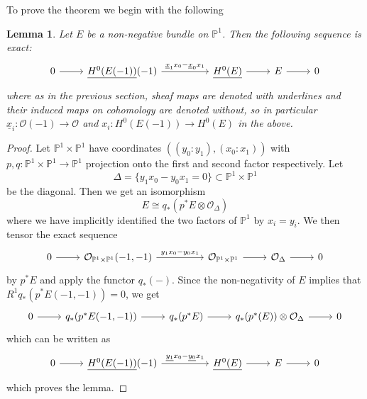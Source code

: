 \documentclass{amsart}
\newtheorem{lemma}[theorem]{Lemma}
\theoremstyle{definition}
\newcommand{\PP}{\mathbb{P}}
\newcommand{\OO}{\mathcal{O}}
\newcommand{\UL}[1]{\underline{#1}}
\begin{document}
To prove the theorem we begin with the following
\begin{lemma}\label{lem: Stromme}
Let $E$ be a non-negative bundle on $\PP^{1}$. Then the following
sequence is exact:
\[
\begin{tikzcd}
0\arrow{r} & \UL{H^{0}(E(-1))}(-1)
\arrow{rr}{\UL{x}_{1}x_{0}-\UL{x}_{0}x_{1}}& &
\UL{H^{0}(E)} \arrow{r} & E\arrow[r] & 0
\end{tikzcd}
\]
where as in the previous section, sheaf maps are denoted with
underlines and their induced maps on cohomology are denoted without,
so in particular $\UL{x}_{i}:\OO (-1)\to \OO$ and
$x_{i}:H^{0}(E(-1))\to H^{0}(E)$ in the above.
\end{lemma}
\begin{proof}
Let $\PP^{1}\times \PP^{1}$ have coordinates
$((y_{0}:y_{1}),(x_{0}:x_{1}))$ with $p,q:\PP^{1}\times \PP^{1}\to
\PP^{1}$ projection onto the first and second factor respectively. Let 
\[
\Delta =\{y_{1}x_{0}-y_{0}x_{1} =0 \}\subset \PP^{1}\times \PP^{1}
\]
be the diagonal. Then we get an isomorphism
\[
E\cong q_{*}\left(p^{*}E\otimes \OO_{\Delta} \right)
\]
where we have implicitly identified the two factors of $\PP^{1}$ by
$x_{i}=y_{i}$.  We then tensor the exact sequence
\[
\begin{tikzcd}
0\arrow[r] & \OO_{\PP^{1}\times \PP^{1}}(-1,-1)
\arrow{rr}{y_{1}x_{0}-y_{0}x_{1}}& & \OO_{\PP^{1}\times \PP^{1}}
\arrow[r]& \OO_{\Delta} \arrow[r]& 0
\end{tikzcd}
\]
by $p^{*}E$ and apply the functor $q_{*}(-)$. Since the non-negativity
of $E$ implies that $R^{1}q_{*}(p^{*}E(-1,-1))=0$, we get
\[
\begin{tikzcd}
0\arrow[r] &q_{*}(p^{*}E(-1,-1)) \arrow[r] & q_{*}(p^{*}E) \arrow[r] &
q_{*}(p^{*}(E))\otimes \OO_{\Delta} \arrow[r] & 0 
\end{tikzcd}
\]
which can be written as 
\[
\begin{tikzcd}
0\arrow[r] &\UL{H^{0}(E(-1))}(-1)
\arrow{rr}{\UL{y_{1}}x_{0}-\UL{y_{0}}x_{1}} && \UL{H^{0}(E)} \arrow[r]
&E \arrow[r] &0
\end{tikzcd}
\]
which proves the lemma.
\end{proof}
\end{document}
